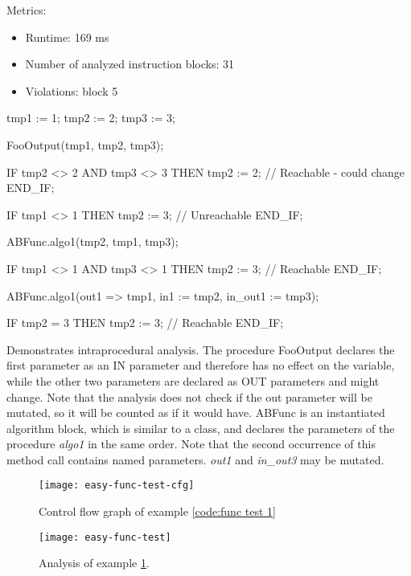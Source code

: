 Metrics:
\begin{itemize}
	\item Runtime: 169 ms
	\item Number of analyzed instruction blocks: 31
	\item Violations: block 5
\end{itemize}


\begin{program}
	\begin{GenericCode}
tmp1 := 1;
tmp2 := 2;
tmp3 := 3;

FooOutput(tmp1, tmp2, tmp3);

IF tmp2 <> 2 AND tmp3 <> 3 THEN
	tmp2 := 2; // Reachable - could change
END_IF;

IF tmp1 <> 1 THEN
	tmp2 := 3; // Unreachable
END_IF;

ABFunc.algo1(tmp2, tmp1, tmp3);

IF tmp1 <> 1 AND tmp3 <> 1 THEN
	tmp2 := 3; // Reachable
END_IF;

ABFunc.algo1(out1 => tmp1, in1 := tmp2, in_out1 := tmp3);

IF tmp2 = 3 THEN
	tmp2 := 3; // Reachable
END_IF;	\end{GenericCode}
	\centering
	\caption{Demonstrates intraprocedural analysis. The procedure  FooOutput declares the first parameter as an IN parameter and therefore has no effect on the variable, while the other two parameters are declared as OUT parameters and might change. Note that the analysis does not check if the out parameter will be mutated, so it will be counted as if it would have. ABFunc is an instantiated algorithm block, which is similar to a class, and declares the parameters of the procedure \emph{algo1} in the same order. Note that the second occurrence of this method call contains named parameters. \emph{out1} and \emph{in\_out3} may be mutated.}
	\label{code:func test 1}
\end{program}
\begin{figure}
	\centering
	\texttt{[image: easy-func-test-cfg]}
	\caption{Control flow graph of example \ref{code:func test 1}}
	\label{fig:func test 1 cfg}
\end{figure}
\begin{figure}
	\centering
	\texttt{[image: easy-func-test]}
	\caption{Analysis of example \ref{fig:func test 1 cfg}.}
	\label{fig:func test 1}
\end{figure}

